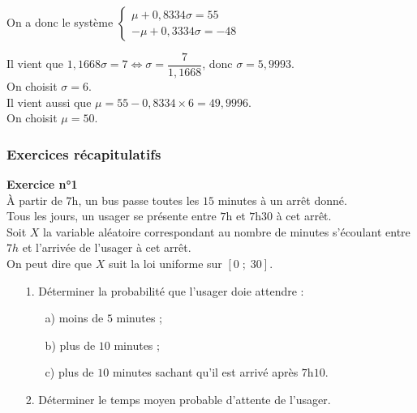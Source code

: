 \vspace*{.5cm}

On a donc le système $\left\{
  \begin{array}{l}
   \mu + 0,8334\sigma = 55 \\
   -\mu + 0,3334\sigma = -48 
  \end{array}
\right.$

\vspace*{.3cm}

Il vient que $1,1668\sigma = 7 \Longleftrightarrow \sigma = \dfrac{7}{1,1668}$, donc $\sigma = 5,9993$. \\

On choisit $\sigma = 6$. \\

Il vient aussi que $\mu = 55 - 0,8334 \times 6 = 49,9996$. \\

On choisit $\mu = 50$. 

\newpage

\subsubsection{Exercices récapitulatifs}

\textbf{Exercice n°1} \\

À partir de $7$h, un bus passe toutes les $15$ minutes à un arrêt donné. \\
Tous les jours, un usager se présente entre $7$h et $7$h$30$ à cet arrêt. \\

Soit $X$ la variable aléatoire correspondant au nombre de minutes s'écoulant entre $7h$ et l'arrivée de l'usager à cet arrêt. \\

On peut dire que $X$ suit la loi uniforme sur $\left[0 \; ; \; 30\right]$. \\

\begin{itemize}
\item[1.] Déterminer la probabilité que l'usager doie attendre : \\
\begin{itemize}
\item[a)] moins de $5$ minutes ;
\item[b)] plus de $10$ minutes ;
\item[c)] plus de $10$ minutes sachant qu'il est arrivé après $7$h$10$. \\
\end{itemize}

\item[2.] Déterminer le temps moyen probable d'attente de l'usager.
\end{itemize}

